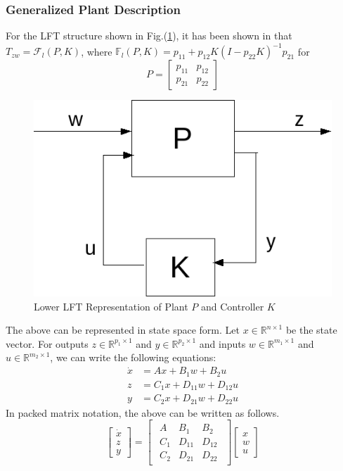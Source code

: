 \documentclass[a4paper,12pt]{article}
\begin{document}
		\subsubsection{Generalized Plant Description}
		For the LFT structure shown in Fig.(\ref{llft}), it has been shown in \cite{prev} that $T_{zw} = \mathscr{F}_{l}(P,K)$, where $\mathbb{F}_{l}(P,K) = p_{11}+p_{12}K(I-p_{22}K)^{-1}p_{21}$ for \[ P= \begin{bmatrix}
		p_{11} &p_{12}\\
		p_{21} &p_{22}
		\end{bmatrix}
		\]
		\begin{figure}[H]
			  \centering
			  \includegraphics[scale=0.5]{llftpk}
%			  
			  \caption{Lower LFT Representation of Plant $P$ and Controller $K$}
			 \label{llft}
		\end{figure}	
		The above can be represented in state space form. Let $x \in \mathbb{R}^{n \times 1}$ be the state vector. For outputs $z \in \mathbb{R}^{p_{1} \times 1}$ and $y \in \mathbb{R}^{p_{2} \times 1}$ and inputs $w \in \mathbb{R}^{m_{1} \times 1}$ and $u \in \mathbb{R}^{m_{2} \times 1}$, we can write the following equations:
		\begin{align}
		\dot{x} &= Ax + B_{1}w + B_{2}u\\
		z&=C_{1}x+D_{11}w+D_{12}u\\
		y&=C_{2}x+D_{21}w+D_{22}u
		\label{ss1}
		\end{align}
		In packed matrix notation, the above can be written as follows.
		\[
		\begin{bmatrix}
		\dot{x} \\ \hline
		z\\
		y
		\end{bmatrix}
		=
		\begin{bmatrix}
	\begin{array}{c|cc}
	A & B_{1} & B_{2}\\ \hline
	C_{1}
	 & D_{11}
	  & D_{12} \\
	  C_{2} & D_{21} & D_{22}
	\end{array}
	\end{bmatrix}
	\begin{bmatrix}
	x \\ \hline
	w\\u
	\end{bmatrix}
		\]
\end{document}
